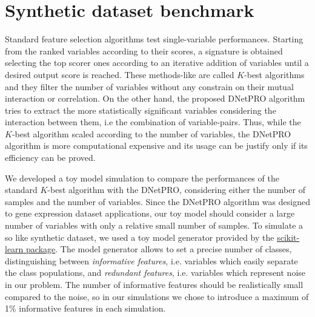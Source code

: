 \documentclass{standalone}
\begin{document}
\section[Toy Model]{Synthetic dataset benchmark}\label{dnetpro:toy}

Standard feature selection algorithms test single-variable performances.
Starting from the ranked variables according to their scores, a signature is obtained selecting the top scorer ones according to an iterative addition of variables until a desired output score is reached.
These methods-like are called $K$-best algorithms and they filter the number of variables without any constrain on their mutual interaction or correlation.
On the other hand, the proposed \textsf{DNetPRO} algorithm tries to extract the more statistically significant variables considering the interaction between them, i.e the combination of variable-pairs.
Thus, while the $K$-best algorithm scaled according to the number of variables, the \textsf{DNetPRO} algorithm is more computational expensive and its usage can be justify only if its efficiency can be proved.

We developed a toy model simulation to compare the performances of the standard $K$-best algorithm with the \textsf{DNetPRO}, considering either the number of samples and the number of variables.
Since the \textsf{DNetPRO} algorithm was designed to gene expression dataset applications, our toy model should consider a large number of variables with only a relative small number of samples.
To simulate a so like synthetic dataset, we used a toy model generator provided by the \href{https://scikit-learn.org/stable/modules/generated/sklearn.datasets.make_classification.html}{\textsf{scikit-learn} package}.
The model generator allows to set a precise number of classes, distinguishing between \emph{informative features}, i.e. variables which easily separate the class populations, and \emph{redundant features}, i.e. variables which represent noise in our problem.
The number of informative features should be realistically small compared to the noise, so in our simulations we chose to introduce a maximum of 1\% informative features in each simulation.
\end{document}
